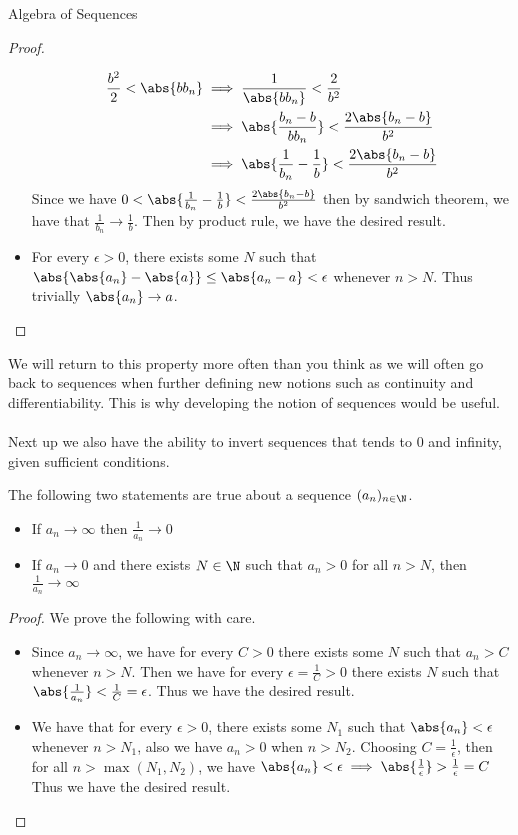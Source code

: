 \begin{prp}{Algebra of Sequences}{}
\begin{proof}
\begin{itemize}
\begin{align*}
\frac{b^2}{2}<\abs{bb_n}&\implies\frac{1}{\abs{bb_n}}<\frac{2}{b^2} \\
&\implies\abs{\frac{b_n-b}{bb_n}}<\frac{2\abs{b_n-b}}{b^2} \\
&\implies\abs{\frac{1}{b_n}-\frac{1}{b}}<\frac{2\abs{b_n-b}}{b^2}
\end{align*}
Since we have $0<\abs{\frac{1}{b_n}-\frac{1}{b}}<\frac{2\abs{b_n-b}}{b^2}$ then by sandwich theorem, we have that $\frac{1}{b_n}\to\frac{1}{b}$. Then by product rule, we have the desired result. 
\item For every $\epsilon>0$, there exists some $N$ such that $\abs{\abs{a_n}-\abs{a}}\leq\abs{a_n-a}<\epsilon$ whenever $n>N$. Thus trivially $\abs{a_n}\to a$. 
\end{itemize}
\end{proof}
\end{prp}

We will return to this property more often than you think as we will often go back to sequences when further defining new notions such as continuity and differentiability. This is why developing the notion of sequences would be useful. \\~\\
Next up we also have the ability to invert sequences that tends to $0$ and infinity, given sufficient conditions. 

\begin{prp}{}{} The following two statements are true about a sequence $(a_n)_{n\in\N}$. 
\begin{itemize}
\item If $a_n\to\infty$ then $\frac{1}{a_n}\to 0$
\item If $a_n\to 0$ and there exists $N\in\N$ such that $a_n>0$ for all $n>N$, then $\frac{1}{a_n}\to\infty$
\end{itemize}\tcbline
\begin{proof} We prove the following with care. 
\begin{itemize}
\item Since $a_n\to\infty$, we have for every $C>0$ there exists some $N$ such that $a_n>C$ whenever $n>N$. Then we have for every $\epsilon=\frac{1}{C}>0$ there exists $N$ such that $\abs{\frac{1}{a_n}}<\frac{1}{C}=\epsilon$. Thus we have the desired result. 
\item We have that for every $\epsilon>0$, there exists some $N_1$ such that $\abs{a_n}<\epsilon$ whenever $n>N_1$, also we have $a_n>0$ when $n>N_2$. Choosing $C=\frac{1}{\epsilon}$, then for all $n>\max{(N_1,N_2)}$, we have $\abs{a_n}<\epsilon\implies\abs{\frac{1}{\epsilon}}>\frac{1}{\epsilon}=C$ Thus we have the desired result. 
\end{itemize}
\end{proof}
\end{prp}

